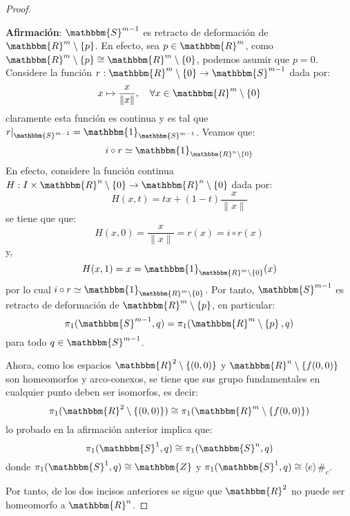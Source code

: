 \documentclass[12pt]{report}
\newcounter{it}
\theoremstyle{largebreak}
\newcommand\cf[3]{\ensuremath{#1:#2\rightarrow#3}}
\newcommand\contradiction{\ensuremath{\#_c}}
\newcommand{\bbm}[1]{\ensuremath{\mathbbm{#1}}}
\newcommand{\gen}[1]{\ensuremath{\langle#1\rangle}}
\begin{document}
\begin{proof}
\begin{enumerate}[label = \textit{(\arabic*)}]
            \textbf{Afirmación}: $\bbm{S}^{m-1}$ es retracto de deformación de $\bbm{R}^m\setminus\left\{p\right\}$. En efecto, sea $p\in\bbm{R}^m$, como $\bbm{R}^m\setminus\left\{p\right\}\cong\bbm{R}^m\setminus\left\{0\right\}$, podemos asumir que $p=0$. Considere la función $\cf{r}{\bbm{R}^m\setminus\left\{0\right\}}{\bbm{S}^{m-1}}$ dada por:
            \begin{equation*}
                x\mapsto\frac{x}{\|x\|},\quad\forall x\in\bbm{R}^m\setminus\left\{0\right\}
            \end{equation*}
            claramente esta función es continua y es tal que $r|_{\bbm{S}^{ m-1}}=\bbm{1}_{\bbm{S}^{ m-1}}$. Veamos que:
            \begin{equation*}
                i\circ r\simeq\bbm{1}_{\bbm{R}^n\setminus\left\{0\right\}}
            \end{equation*}
            En efecto, considere la función continua $\cf{H}{I\times\bbm{R}^n\setminus\left\{0\right\}}{\bbm{R}^n\setminus\left\{0\right\}}$ dada por:
            \begin{equation*}
                H(x,t)=tx+(1-t)\frac{x}{\|x\|}
            \end{equation*}
            se tiene que que:
            \begin{equation*}
                H(x,0)=\frac{x}{\|x\|}=r(x)=i\circ r(x)
            \end{equation*}
            y,
            \begin{equation*}
                H(x,1)=x=\bbm{1}_{\bbm{R}^{m}\setminus\left\{0\right\}}(x)
            \end{equation*}
            por lo cual $i\circ r\simeq\bbm{1}_{\bbm{R}^m\setminus\left\{0\right\}}$. Por tanto, $\bbm{S}^{m-1}$ es retracto de deformación de $\bbm{R}^m\setminus\left\{p\right\}$, en particular:
            \begin{equation*}
                \pi_1(\bbm{S}^{m-1},q)=\pi_1(\bbm{R}^m\setminus\left\{p\right\},q)
            \end{equation*}
            para todo $q\in\bbm{S}^{ m-1}$.

            Ahora, como los espacios $\bbm{R}^2\setminus\left\{(0,0)\right\}$ y $\bbm{R}^n\setminus\left\{f(0,0)\right\}$ son homeomorfos y arco-conexos, se tiene que sus grupo fundamentales en cualquier punto deben ser isomorfos, es decir:
            \begin{equation*}
                \pi_1(\bbm{R}^2\setminus\left\{(0,0)\right\})\cong\pi_1(\bbm{R}^m\setminus\left\{f(0,0)\right\})
            \end{equation*}
            lo probado en la afirmación anterior implica que:
            \begin{equation*}
                \pi_1(\bbm{S}^1,q)\cong\pi_1(\bbm{S}^n,q)
            \end{equation*}
            donde $\pi_1(\bbm{S}^1,q)\cong\bbm{Z}$ y $\pi_1(\bbm{S}^1,q)\cong\gen{e}$\contradiction.
        \end{enumerate}
        Por tanto, de los dos incisos anteriores se sigue que $\bbm{R}^2$ no puede ser homeomorfo a $\bbm{R}^n$.
    \end{proof}
\end{document}
